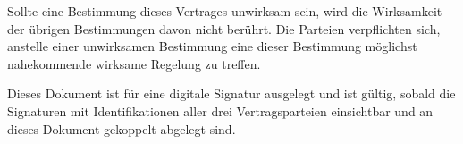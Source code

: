 \documentclass[parskip=half]{scrreprt}
\begin{document}
  
  
Sollte eine Bestimmung dieses Vertrages unwirksam sein, wird die Wirksamkeit der übrigen Bestimmungen davon nicht berührt. Die Parteien verpflichten sich, anstelle einer unwirksamen Bestimmung eine dieser Bestimmung möglichst nahekommende wirksame Regelung zu treffen. 


Dieses Dokument ist für eine digitale Signatur ausgelegt und ist gültig, sobald die Signaturen mit Identifikationen aller drei Vertragsparteien einsichtbar und an dieses Dokument gekoppelt abgelegt sind.
%
  
\end{document}
